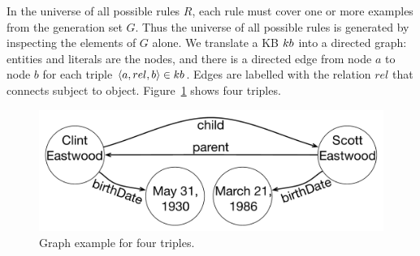 In the universe of all possible rules $R$, 
each rule must cover one or more examples from the generation set $G$. 
Thus the universe of all possible rules is generated by inspecting the elements of $G$ alone. 
We translate a KB ${\sc kb}$ into a directed graph: entities and literals are the nodes, and there is a directed edge from node $a$ to node $b$ for each triple $\langle a,rel,b\rangle \in {\sc kb}$. 
Edges are labelled with the relation $rel$ that connects subject to object. Figure~\ref{fig:krd_graph_example} shows four triples.

\begin{figure}[t]
	\centering
	\includegraphics[width=0.8\columnwidth]{include/figure/graph_example.pdf}
	\vspace{-2.5ex}
	\caption{Graph example for four triples.}
	\label{fig:krd_graph_example}
	\vspace{-3ex}
\end{figure}

